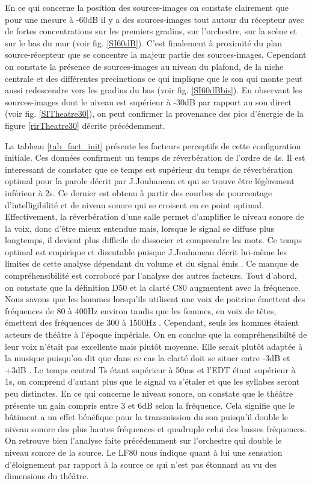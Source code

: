 %
En ce qui concerne la position des sources-images on constate clairement que pour une mesure à -60dB il y a des sources-images tout autour du récepteur avec de fortes concentrations sur les premiers gradins, sur l'orchestre, sur la scène et sur le bas du mur (voir fig. \ref{SI60dB}). C'est finalement à proximité du plan source-récepteur que se concentre la majeur partie des sources-images. Cependant on constate la présence de sources-images au niveau du plafond, de la niche centrale et des différentes \glspl{precinction} ce qui implique que le son qui monte peut aussi redescendre vers les gradins du bas (voir fig. \ref{SI60dBbis}). En observant les sources-images dont le niveau est supérieur à -30dB par rapport au son direct (voir fig. \ref{SITheatre30}), on peut confirmer la provenance des pics d'énergie de la figure \ref{rirTheatre30} décrite précédemment. 

La tableau \ref{tab_fact_init} présente les facteurs perceptifs de cette configuration initiale. Ces données confirment un temps de réverbération de l'ordre de 4s. Il est interessant de constater que ce temps est supérieur du temps de réverbération optimal pour la parole décrit par J.Jouhaneau \cite[p.209]{jouhaneau} et qui se trouve être légèrement inférieur à 2s. Ce dernier est obtenu à partir des courbes de pourcentage d'intelligibilité et de niveau sonore qui se croisent en ce point optimal. Effectivement, la réverbération d'une salle permet d'amplifier le niveau sonore de la voix, donc d'être mieux entendue mais, lorsque le signal se diffuse plus longtemps, il devient plus difficile de dissocier et comprendre les mots. Ce temps optimal est empirique et discutable puisque J.Jouhaneau décrit lui-même les limites de cette analyse dépendant du volume et du signal émis \cite[p.218]{jouhaneau}. Ce manque de compréhensibilité est corroboré par l'analyse des autres facteurs. Tout d'abord, on constate que la définition \gls{D50} et la clarté \gls{C80} augmentent avec la fréquence. Nous savons que les hommes lorsqu'ils utilisent une voix de poitrine émettent des fréquences de 80 à 400Hz environ tandis que les femmes, en voix de têtes, émettent des fréquences de 300 à 1500Hz \cite[Mécanismes vocaux]{voix}. Cependant, seuls les hommes étaient acteurs de théâtre à l'époque impériale. On en conclue que la compréhensibilté de leur voix n'était pas excellente mais plutôt moyenne. Elle serait plutôt adaptée à la musique puisqu'on dit que dans ce cas la clarté doit se situer entre -3dB et +3dB \cite[p.59]{acoustique}. Le temps central \gls{Ts} étant supérieur à 50ms et l'\gls{EDT} étant supérieur à 1s, on comprend d'autant plus que le signal va s'étaler et que les syllabes seront peu distinctes. En ce qui concerne le niveau sonore, on constate que le théâtre présente un gain compris entre 3 et 6dB selon la fréquence. Cela signifie que le bâtiment a un effet bénéfique pour la transmission du son puisqu'il double le niveau sonore des plus hautes fréquences et quadruple celui des basses fréquences. On retrouve bien l'analyse faite précédemment sur l'orchestre qui double le niveau sonore de la source. Le \gls{LF80} nous indique quant à lui une sensation d'éloignement par rapport à la source ce qui n'est pas étonnant au vu des dimensions du théâtre.


